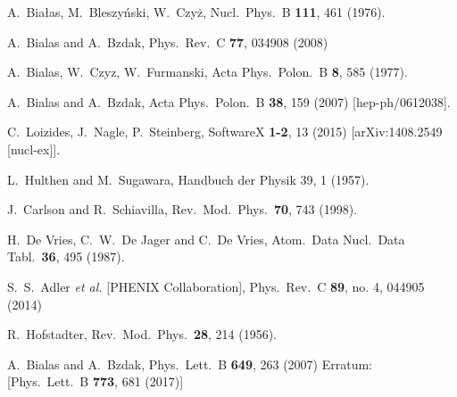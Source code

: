 \documentclass[a4paper,12pt]{article}
\begin{document}
\begin{thebibliography}{9}
  A.~Białas, M.~Bleszyński, W.~Czyż,
  Nucl.\ Phys.\ B {\bf 111}, 461 (1976).

  A.~Bialas and A.~Bzdak,
  Phys.\ Rev.\ C {\bf 77}, 034908 (2008)

  A.~Bialas, W.~Czyz, W.~Furmanski,
  Acta Phys.\ Polon.\ B {\bf 8}, 585 (1977).

  A.~Bialas and A.~Bzdak,
  Acta Phys.\ Polon.\ B {\bf 38}, 159 (2007)
  [hep-ph/0612038].

  C.~Loizides, J.~Nagle, P.~Steinberg,
  SoftwareX {\bf 1-2}, 13 (2015)
  [arXiv:1408.2549 [nucl-ex]].

  L.~Hulthen and M.~Sugawara, Handbuch der Physik 39, 1 (1957).

  J.~Carlson and R.~Schiavilla,
  Rev.\ Mod.\ Phys.\  {\bf 70}, 743 (1998).

  H.~De Vries, C.~W.~De Jager and C.~De Vries,
  Atom.\ Data Nucl.\ Data Tabl.\  {\bf 36}, 495 (1987).

  S.~S.~Adler {\it et al.} [PHENIX Collaboration],
  Phys.\ Rev.\ C {\bf 89}, no. 4, 044905 (2014)

  R.~Hofstadter,
  Rev.\ Mod.\ Phys.\  {\bf 28}, 214 (1956).

  A.~Bialas and A.~Bzdak,
  Phys.\ Lett.\ B {\bf 649}, 263 (2007)
  Erratum: [Phys.\ Lett.\ B {\bf 773}, 681 (2017)]


\end{thebibliography}
\end{document}
